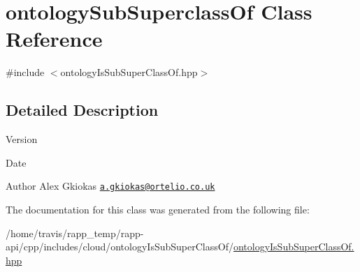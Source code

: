 \hypertarget{classontologySubSuperclassOf}{\section{ontology\-Sub\-Superclass\-Of Class Reference}
\label{classontologySubSuperclassOf}
}


{\ttfamily \#include $<$ontology\-Is\-Sub\-Super\-Class\-Of.\-hpp$>$}



\subsection{Detailed Description}
\begin{DoxyVersion}{Version}

\end{DoxyVersion}
\begin{DoxyDate}{Date}

\end{DoxyDate}
\begin{DoxyAuthor}{Author}
Alex Gkiokas \href{mailto:a.gkiokas@ortelio.co.uk}{\tt a.\-gkiokas@ortelio.\-co.\-uk} 
\end{DoxyAuthor}


The documentation for this class was generated from the following file\-:\begin{DoxyCompactItemize}
\item 
/home/travis/rapp\-\_\-temp/rapp-\/api/cpp/includes/cloud/ontology\-Is\-Sub\-Super\-Class\-Of/\hyperlink{ontologyIsSubSuperClassOf_8hpp}{ontology\-Is\-Sub\-Super\-Class\-Of.\-hpp}\end{DoxyCompactItemize}
